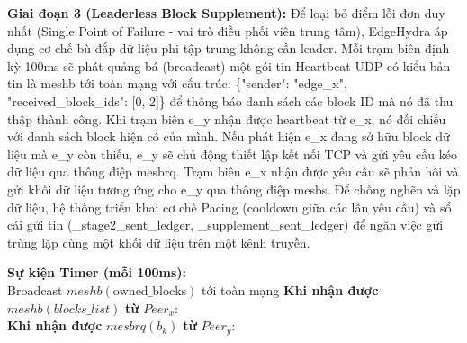\documentclass[11pt,a4paper]{article}
\begin{document}
\begin{algorithm}[H]
\caption{Chuyển tiếp dữ liệu thích ứng tại Trạm biên (Stage 2)}
\end{algorithm}

\textbf{Giai đoạn 3 (Leaderless Block Supplement):} Để loại bỏ điểm lỗi đơn duy nhất (Single Point of Failure - vai trò điều phối viên trung tâm), EdgeHydra áp dụng cơ chế bù đắp dữ liệu phi tập trung không cần leader. Mỗi trạm biên định kỳ 100ms sẽ phát quảng bá (broadcast) một gói tin Heartbeat UDP có kiểu bản tin là meshb tới toàn mạng với cấu trúc: \{"sender": "edge\_x", "received\_block\_ids": [0, 2]\} để thông báo danh sách các block ID mà nó đã thu thập thành công. Khi trạm biên e\_y nhận được heartbeat từ e\_x, nó đối chiếu với danh sách block hiện có của mình. Nếu phát hiện e\_x đang sở hữu block dữ liệu mà e\_y còn thiếu, e\_y sẽ chủ động thiết lập kết nối TCP và gửi yêu cầu kéo dữ liệu qua thông điệp mesbrq. Trạm biên e\_x nhận được yêu cầu sẽ phản hồi và gửi khối dữ liệu tương ứng cho e\_y qua thông điệp mesbs. Để chống nghẽn và lặp dữ liệu, hệ thống triển khai cơ chế Pacing (cooldown giữa các lần yêu cầu) và sổ cái gửi tin (\_stage2\_sent\_ledger, \_supplement\_sent\_ledger) để ngăn việc gửi trùng lặp cùng một khối dữ liệu trên một kênh truyền.

\begin{algorithm}[H]
\caption{Bù đắp dữ liệu phi tập trung (Stage 3)}
\textbf{Sự kiện Timer (mỗi 100ms):}\\
Broadcast $meshb(\text{owned\_blocks})$ tới toàn mạng\;
\vspace{2mm}
\textbf{Khi nhận được } $meshb(blocks\_list)$ \textbf{ từ } $Peer_x$: \\
\vspace{2mm}
\textbf{Khi nhận được } $mesbrq(b_k)$ \textbf{ từ } $Peer_y$: \\
\end{algorithm}
\end{document}
